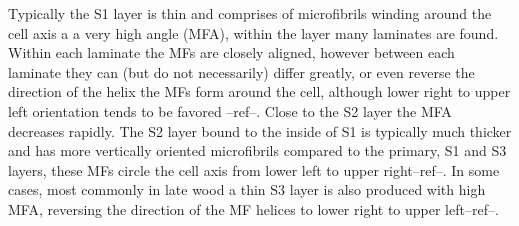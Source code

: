 Typically the S1 layer is thin and comprises of microfibrils winding around the
cell axis a a very high angle (MFA), within the layer many laminates are found.
Within each laminate the MFs are closely aligned, however between each laminate
they can (but do not necessarily) differ greatly, or even reverse the direction
of the helix the MFs form around the cell, although lower right to upper left
orientation tends to be favored --ref--. Close to the S2 layer the MFA decreases
rapidly. The S2 layer bound to the inside of S1 is typically much thicker and
has more vertically oriented microfibrils compared to the primary, S1 and S3
layers, these MFs circle the cell axis from lower left to upper right--ref--. In
some cases, most commonly in late wood a thin S3 layer is also produced with
high MFA, reversing the direction of the MF helices to lower right to upper
left--ref--.